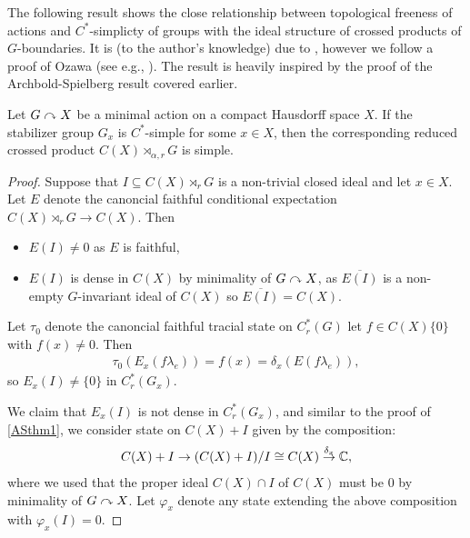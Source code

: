 The following result shows the close relationship between topological freeness of actions and $C^*$-simplicty of groups with the ideal structure of crossed products of $G$-boundaries. It is (to the author's knowledge) due to \cite{breuillard2017c}, however we follow a proof of Ozawa (see e.g., \cite{ozawa2014lecture}). The result is heavily inspired by the proof of the Archbold-Spielberg result covered earlier.
\begin{proposition}
	Let $G \stackrel{}{\curvearrowright} X$ be a minimal action on a compact Hausdorff space $X$. If the stabilizer group $G_x$ is $C^*$-simple for some $x \in X$, then the corresponding reduced crossed product $C(X) \rtimes_{\alpha,r} G$ is simple.
	\label{ozawa15pt1}
\end{proposition}
\begin{proof}
	Suppose that $I \subseteq C(X) \rtimes_r G$ is a non-trivial closed ideal and let $x \in X$. Let $E$ denote the canoncial faithful conditional expectation $C(X) \rtimes_r G \to C(X)$. Then
\begin{itemize}
	\item $E(I) \neq 0$ as $E$ is faithful,
	\item $E(I)$ is dense in $C(X)$ by minimality of $G \stackrel{}{\curvearrowright}X$, as $\overline{E(I)}$ is a non-empty $G$-invariant ideal of $C(X)$ so $\overline{E(I)} = C(X)$.
\end{itemize}
Let $\tau_0$ denote the canoncial faithful tracial state on $C_r^*(G)$ let $f \in C(X)\{0\}$ with $f(x) \neq 0$. Then 
\begin{align*}
	\tau_0 (E_x(f \lambda_e))= f(x) = \delta_x(E(f\lambda_e)),
\end{align*}
so $E_x(I) \neq \{0\}$ in $C_r^*(G_x)$. 

We claim that $E_x(I)$ is not dense in $C_r^*(G_x)$, and similar to the proof of \cref{ASthm1}, we consider state on $C(X) + I$ given by the composition:
	\begin{align*}
		C(X) + I \to (C(X)+I)/I \cong C(X) \stackrel {\delta_x} \to \mathbb{C},
	\end{align*}
	where we used that the proper ideal $C(X) \cap I$ of $C(X)$ must be $0$ by minimality of $G \stackrel{}{\curvearrowright} X$. Let $\varphi_x$ denote any state extending the above composition with $\varphi_x(I) =0$.
	

\end{proof}
